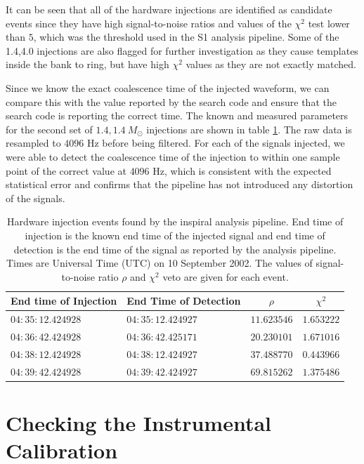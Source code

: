 It can be seen that all of the hardware injections are identified as candidate
events since they have high signal-to-noise ratios and values of the $\chi^2$
test lower than $5$, which was the threshold used in the S1 analysis
pipeline\cite{abbott2003b}. Some of the 1.4,4.0 injections are also flagged
for further investigation as they cause templates inside the bank to ring, but
have high $\chi^2$ values as they are not exactly matched.

Since we know the exact coalescence time of the injected waveform, we can
compare this with the value reported by the search code and ensure that the
search code is reporting the correct time.  The known and measured parameters
for the second set of $1.4,1.4\ M_\odot$ injections are shown in table
\ref{t:triggers}. The raw data is resampled to $4096$ Hz before being
filtered. For each of the signals injected, we were able to detect the
coalescence time of the injection to within one sample point of the correct
value at $4096$ Hz, which is consistent with the expected statistical error
and confirms that the pipeline has not introduced any distortion of the
signals.

\begin{table}[htb]
  \begin{flushright}
  \begin{tabular}{l|l|c|c}
  End time of Injection&End Time of Detection&$\rho$&$\chi^2$\\
  \hline
  $04:35:12.424928$ & $04:35:12.424927$ & $11.623546$ & $1.653222$ \\
  $04:36:42.424928$ & $04:36:42.425171$ & $20.230101$ & $1.671016$ \\
  $04:38:12.424928$ & $04:38:12.424927$ & $37.488770$ & $0.443966$ \\
  $04:39:42.424928$ & $04:39:42.424927$ & $69.815262$ & $1.375486$ \\
  \end{tabular}
  \end{flushright}
  \caption{%
  Hardware injection events found by the inspiral analysis pipeline. End time
  of injection is the known end time of the injected signal and end time of
  detection is the end time of the signal as reported by the analysis
  pipeline. Times are Universal Time (UTC) on 10 September 2002. The values of
  signal-to-noise ratio $\rho$ and $\chi^2$ veto are given for each event.
  }
\label{t:triggers}
\end{table}

\section{Checking the Instrumental Calibration}
\label{s:calibration}

